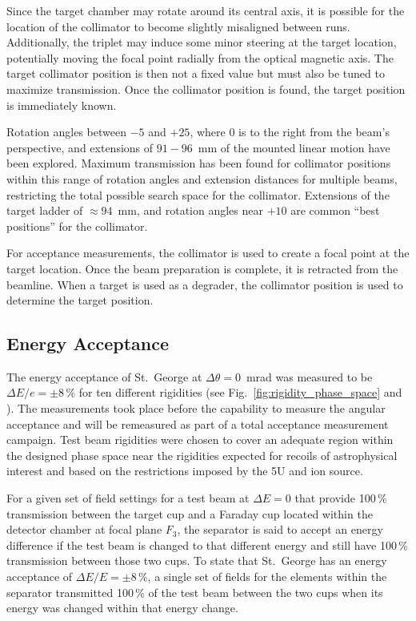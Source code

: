 Since the target chamber may rotate around its central axis, it is possible for
the location of the collimator to become slightly misaligned between runs.
Additionally,
the triplet may induce some minor steering at the target location, potentially
moving the focal point radially from the optical magnetic axis. The target
collimator position is then not a fixed value but must also be tuned to
maximize transmission. Once the collimator position is found, the target
position is immediately known.

Rotation angles between $-5$ and $+25$\degree{}, where 0\degree{} is to the
right from the beam's perspective, and extensions of $91-96$~mm of the mounted
linear motion have been explored. Maximum transmission has been found for
collimator positions within this range of rotation angles and extension
distances for multiple beams, restricting
the total possible search space for the collimator. Extensions of the
target ladder of $\approx 94$~mm, and rotation angles near $+10$\degree{} are
common ``best positions'' for the collimator.

For acceptance measurements, the collimator is used to create a focal point at
the target location. Once the beam preparation is complete, it is retracted
from the beamline. When a target is used as a degrader, the collimator position
is used to determine the target position.


\subsection{Energy Acceptance}

The energy acceptance of St.\ George at $\Delta\theta = 0$~mrad was measured to
be $\Delta E/e = \pm 8$\,\% for ten different rigidities (see
Fig.~\ref{fig:rigidity_phase_space} and \cite{Meisel2017}). The measurements
took place before the capability to measure the angular acceptance and will
be remeasured as part of a total acceptance measurement campaign. Test beam
rigidities were chosen to cover an adequate region within the designed phase
space near the rigidities expected for recoils of astrophysical interest and
based on the restrictions imposed by the 5U and ion source.

For a given set of field settings for a test beam at $\Delta E = 0$ that
provide 100\,\% transmission between the target cup and a Faraday cup located
within the detector chamber at focal plane $F_3$, the separator is said to
accept an energy difference if the test beam is changed to that different
energy and still have 100\,\% transmission between those two cups. To state that
St.\ George has an energy acceptance of $\Delta E/E = \pm 8$\,\%, a single set of
fields for the elements within the separator transmitted 100\,\% of the test beam
between the two cups when its energy was changed within that energy change.

